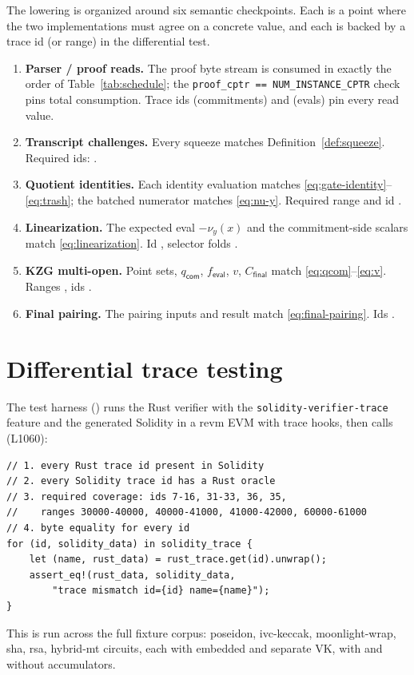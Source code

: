 The lowering is organized around six semantic checkpoints. Each is a point
where the two implementations must agree on a concrete value, and each is
backed by a trace id (or range) in the differential test.

\begin{enumerate}[leftmargin=1.6em,itemsep=3pt]
  \item \textbf{Parser / proof reads.} The proof byte stream is consumed in
        exactly the order of Table~\ref{tab:schedule}; the
        \texttt{proof\_\allowbreak{}cptr == NUM\_\allowbreak{}INSTANCE\_\allowbreak{}CPTR} check pins total
        consumption. Trace ids  (commitments) and
         (evals) pin every read value.
  \item \textbf{Transcript challenges.} Every squeeze matches
        Definition~\ref{def:squeeze}. Required ids: .
  \item \textbf{Quotient identities.} Each identity evaluation matches
        \eqref{eq:gate-identity}--\eqref{eq:trash}; the batched numerator
        matches \eqref{eq:nu-y}. Required range  and
        id .
  \item \textbf{Linearization.} The expected eval
        $-\nu_y(x)$ and the commitment-side scalars match
        \eqref{eq:linearization}. Id , selector folds
        .
  \item \textbf{KZG multi-open.} Point sets, $q_{\mathsf{com}}$,
        $f_{\mathsf{eval}}$, $v$, $C_{\mathsf{final}}$ match
        \eqref{eq:qcom}--\eqref{eq:v}. Ranges ,
        ids .
  \item \textbf{Final pairing.} The pairing inputs and result match
        \eqref{eq:final-pairing}. Ids .
\end{enumerate}

\section{Differential trace testing}
\label{sec:diff-testing}

The test harness () runs the Rust verifier with the
\texttt{solidity-verifier-trace} feature and the generated Solidity in a
revm EVM with trace hooks, then calls
 (L1060):
\begin{lstlisting}[style=rust]
// 1. every Rust trace id present in Solidity
// 2. every Solidity trace id has a Rust oracle
// 3. required coverage: ids 7-16, 31-33, 36, 35,
//    ranges 30000-40000, 40000-41000, 41000-42000, 60000-61000
// 4. byte equality for every id
for (id, solidity_data) in solidity_trace {
    let (name, rust_data) = rust_trace.get(id).unwrap();
    assert_eq!(rust_data, solidity_data,
        "trace mismatch id={id} name={name}");
}
\end{lstlisting}
This is run across the full fixture corpus: poseidon, ivc-keccak,
moonlight-wrap, sha, rsa, hybrid-mt circuits, each with embedded and
separate VK, with and without accumulators.

